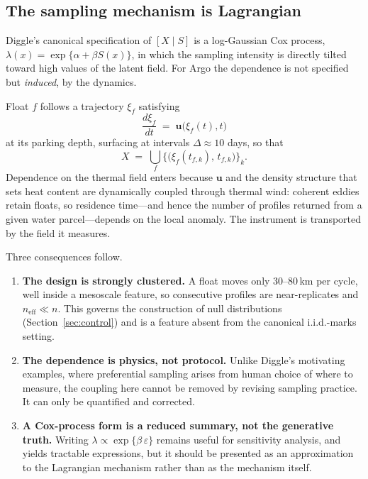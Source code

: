\documentclass[11pt]{article}
\begin{document}
\subsection{The sampling mechanism is Lagrangian}
\label{sec:lagrangian}

Diggle's canonical specification of $[X \mid S]$ is a log-Gaussian Cox process,
$\lambda(x) = \exp\{\alpha + \beta S(x)\}$, in which the sampling intensity is directly tilted
toward high values of the latent field. For Argo the dependence is not specified but
\emph{induced}, by the dynamics.

Float $f$ follows a trajectory $\xi_f$ satisfying
\begin{equation}
  \frac{d\xi_f}{dt} \;=\; \mathbf{u}\big(\xi_f(t), t\big)
\end{equation}
at its parking depth, surfacing at intervals $\Delta \approx 10$ days, so that
\begin{equation}
  X \;=\; \bigcup_f \big\{ \big(\xi_f(t_{f,k}),\, t_{f,k}\big) \big\}_k .
\end{equation}
Dependence on the thermal field enters because $\mathbf{u}$ and the density structure that sets
heat content are dynamically coupled through thermal wind: coherent eddies retain floats, so
residence time---and hence the number of profiles returned from a given water parcel---depends
on the local anomaly. The instrument is transported by the field it measures.

Three consequences follow.

\begin{enumerate}[leftmargin=*]
  \item \textbf{The design is strongly clustered.} A float moves only $30$--$80$\,km per cycle,
    well inside a mesoscale feature, so consecutive profiles are near-replicates and
    $n_{\text{eff}} \ll n$. This governs the construction of null distributions
    (Section~\ref{sec:control}) and is a feature absent from the canonical i.i.d.-marks setting.
  \item \textbf{The dependence is physics, not protocol.} Unlike Diggle's motivating examples,
    where preferential sampling arises from human choice of where to measure, the coupling here
    cannot be removed by revising sampling practice. It can only be quantified and corrected.
  \item \textbf{A Cox-process form is a reduced summary, not the generative truth.} Writing
    $\lambda \propto \exp\{\beta\,\varepsilon\}$ remains useful for sensitivity analysis, and
    yields tractable expressions, but it should be presented as an approximation to the
    Lagrangian mechanism rather than as the mechanism itself.
\end{enumerate}
\end{document}
